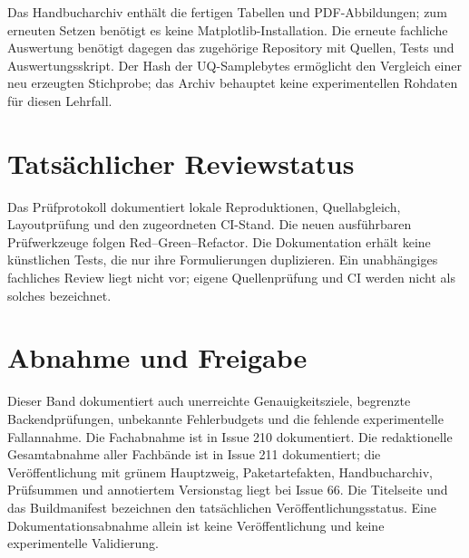 Das Handbucharchiv enthält die fertigen Tabellen und PDF-Abbildungen; zum
erneuten Setzen benötigt es keine Matplotlib-Installation. Die erneute
fachliche Auswertung benötigt dagegen das zugehörige Repository mit Quellen,
Tests und Auswertungsskript. Der Hash der UQ-Samplebytes ermöglicht den
Vergleich einer neu erzeugten Stichprobe; das Archiv behauptet keine
experimentellen Rohdaten für diesen Lehrfall.

\section{Tatsächlicher Reviewstatus}
Das Prüfprotokoll  dokumentiert lokale
Reproduktionen, Quellabgleich, Layoutprüfung und den zugeordneten CI-Stand.
Die neuen ausführbaren Prüfwerkzeuge folgen Red--Green--Refactor.
Die Dokumentation erhält keine künstlichen Tests, die nur ihre Formulierungen
duplizieren. Ein unabhängiges fachliches Review liegt nicht vor; eigene
Quellenprüfung und CI werden nicht als solches bezeichnet.

\section{Abnahme und Freigabe}
Dieser Band dokumentiert auch unerreichte Genauigkeitsziele, begrenzte
Backendprüfungen, unbekannte Fehlerbudgets und die fehlende experimentelle
Fallannahme. Die Fachabnahme ist in Issue 210 dokumentiert.
Die redaktionelle Gesamtabnahme aller Fachbände ist in Issue 211 dokumentiert; die Veröffentlichung
mit grünem Hauptzweig, Paketartefakten, Handbucharchiv, Prüfsummen und
annotiertem Versionstag liegt bei Issue 66. Die Titelseite und das Buildmanifest
bezeichnen den tatsächlichen Veröffentlichungsstatus. Eine Dokumentationsabnahme allein ist keine
Veröffentlichung und keine experimentelle Validierung.
